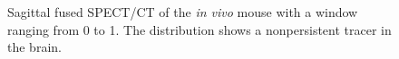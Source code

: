 \documentclass[utf8]{FrontiersinHarvard} %
\begin{document}
\begin{figure}[h!]
\setcounter{figure}{2}
\begin{center}
\end{center}
\caption{Sagittal fused SPECT/CT of the \textit{in vivo} mouse with a window ranging from 0 to 1. The  distribution shows a nonpersistent tracer in the brain.}\label{fig:invivo}
\end{figure}

\end{document}

